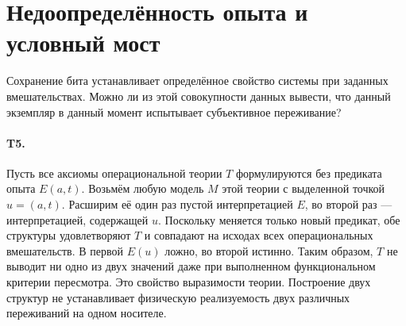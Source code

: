 \section{Недоопределённость опыта и условный мост}
\label{sec:boundary}
Сохранение бита устанавливает определённое свойство системы при заданных вмешательствах. Можно ли из этой совокупности данных вывести, что данный экземпляр в данный момент испытывает субъективное переживание?

\paragraph{T5.} Пусть все аксиомы операциональной теории $T$ формулируются без предиката опыта $E(a,t)$. Возьмём любую модель $M$ этой теории с выделенной точкой $u=(a,t)$. Расширим её один раз пустой интерпретацией $E$, во второй раз --- интерпретацией, содержащей $u$. Поскольку меняется только новый предикат, обе структуры удовлетворяют $T$ и совпадают на исходах всех операциональных вмешательств. В первой $E(u)$ ложно, во второй истинно. Таким образом, $T$ не выводит ни одно из двух значений даже при выполненном функциональном критерии пересмотра. Это свойство выразимости теории. Построение двух структур не устанавливает физическую реализуемость двух различных переживаний на одном носителе.

